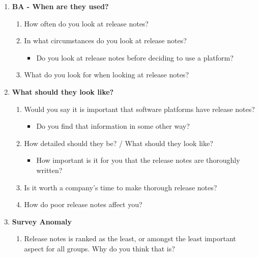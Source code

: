 \documentclass{cslthse-msc}
\begin{document}
    \begin{enumerate}[label=B\Alph*]
        \item \textbf{BA - When are they used?}
        \begin{enumerate}[label=BA\arabic*]
            \item How often do you look at release notes?
            \item In what circumstances do you look at release notes?
            \begin{itemize}[label={-}]
                \item Do you look at release notes before deciding to use a platform?
            \end{itemize}
            \item What do you look for when looking at release notes?
        \end{enumerate}
        \item \textbf{What should they look like?}

        \begin{enumerate}[label=BB\arabic*]
            \item Would you say it is important that software platforms have release notes?
            \begin{itemize}[label={-}]
                \item Do you find that information in some other way?
            \end{itemize}
            \item How detailed should they be? / What should they look like?
            \begin{itemize}[label={-}]
                \item How important is it for you that the release notes are thoroughly written?
            \end{itemize}
            \item Is it worth a company's time to make thorough release notes?
            \item How do poor release notes affect you?
        \end{enumerate}
        \item \textbf{Survey Anomaly}
        \begin{enumerate}[label=BC\arabic*]
            \item Release notes is ranked as the least, or amongst the least important aspect for all groups. Why do you think that is?
        \end{enumerate}
    \end{enumerate}
\end{document}
